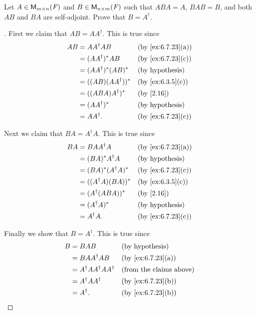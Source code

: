 \begin{ex}\label{ex:6.7.24}
  Let \(A \in \ms\) and \(B \in \ms[n][m][\F]\) such that \(ABA = A\), \(BAB = B\), and both \(AB\) and \(BA\) are self-adjoint.
  Prove that \(B = A^{\dag}\).
\end{ex}

\begin{proof}[]
  First we claim that \(AB = A A^{\dag}\).
  This is true since
  \begin{align*}
    AB & = A A^{\dag} A B        &  & \by{ex:6.7.23}[a]      \\
       & = (A A^{\dag})^* AB     &  & \by{ex:6.7.23}[c]      \\
       & = (A A^{\dag})^* (AB)^* &  & \text{(by hypothesis)} \\
       & = ((AB) (A A^{\dag}))^* &  & \by{ex:6.3.5}[c]       \\
       & = ((ABA) A^{\dag})^*    &  & \by{2.16}              \\
       & = (A A^{\dag})^*        &  & \text{(by hypothesis)} \\
       & = A A^{\dag}.           &  & \by{ex:6.7.23}[c]
  \end{align*}

  Next we claim that \(BA = A^{\dag} A\).
  This is true since
  \begin{align*}
    BA & = B A A^{\dag} A         &  & \by{ex:6.7.23}[a]      \\
       & = (B A)^* A^{\dag} A     &  & \text{(by hypothesis)} \\
       & = (B A)^* (A^{\dag} A)^* &  & \by{ex:6.7.23}[c]      \\
       & = ((A^{\dag} A) (BA))^*  &  & \by{ex:6.3.5}[c]       \\
       & = (A^{\dag} (ABA))^*     &  & \by{2.16}              \\
       & = (A^{\dag} A)^*         &  & \text{(by hypothesis)} \\
       & = A^{\dag} A.            &  & \by{ex:6.7.23}[c]
  \end{align*}

  Finally we show that \(B = A^{\dag}\).
  This is true since
  \begin{align*}
    B & = BAB                            &  & \text{(by hypothesis)}         \\
      & = B A A^{\dag} A B               &  & \by{ex:6.7.23}[a]              \\
      & = A^{\dag} A A^{\dag} A A^{\dag} &  & \text{(from the claims above)} \\
      & = A^{\dag} A A^{\dag}            &  & \by{ex:6.7.23}[b]              \\
      & = A^{\dag}.                      &  & \by{ex:6.7.23}[b]
  \end{align*}
\end{proof}

